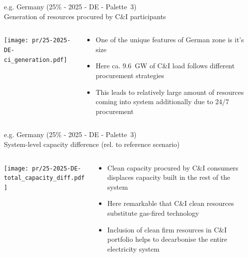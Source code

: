 \begin{frame}{e.g. Germany (25\% - 2025 - DE - Palette~3) 
\\ Generation of resources procured by C\&I participants}

\begin{columns}[T]
\begin{column}{9cm}
\centering

\texttt{[image: pr/25-2025-DE-ci\_generation.pdf]}
\end{column}
\begin{column}{5cm}

  \begin{itemize}
  \item  One of the unique features of German zone is it's size
  \item Here ca. \alert{9.6~GW} of C\&I load follows different procurement strategies
  \item This leads to relatively \alert{large amount of resources coming into system additionally} due to 24/7 procurement
  \end{itemize}
  
\end{column}
\end{columns}

\end{frame}



\begin{frame}{e.g. Germany (25\% - 2025 - DE - Palette~3) 
\\ System-level capacity difference (rel. to reference scenario)}

\begin{columns}[T]
\begin{column}{9cm}
\centering

\texttt{[image: pr/25-2025-DE-total\_capacity\_diff.pdf]}
\end{column}
\begin{column}{5cm}

  \begin{itemize}
  \item  Clean capacity procured by C\&I consumers displaces capacity built in the rest of the system 
  \item Here remarkable that \alert{C\&I clean resources substitute gas-fired technology}
  \item Inclusion of clean firm resources in C\&I portfolio \alert{helps to decarbonise} the entire electricity system
  \end{itemize}
  
\end{column}
\end{columns}

\end{frame}


